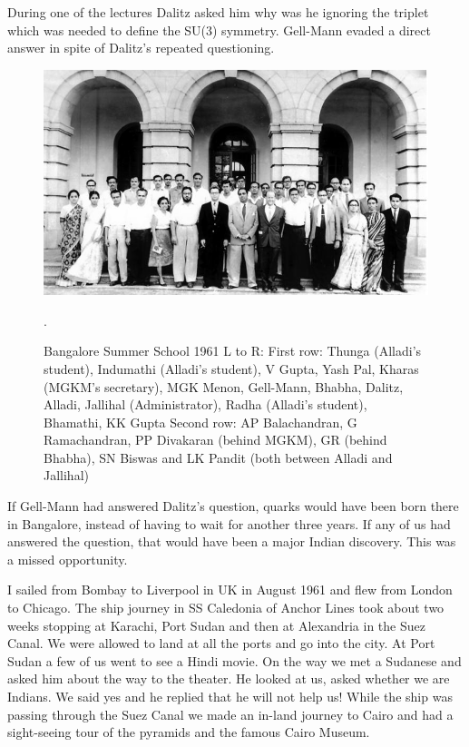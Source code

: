 During one of the lectures Dalitz asked him why was he ignoring the 
triplet which was needed to define the SU(3) symmetry. Gell-Mann evaded 
a direct answer in spite of Dalitz's repeated questioning.
\medskip

\begin{figure}[h]
\centering
\includegraphics[width=\textwidth]{images/Rajaji-gellmann.jpg}
\caption{Bangalore Summer School 1961
L to R: First row: Thunga (Alladi's student), Indumathi (Alladi's
student), V Gupta, Yash Pal, Kharas (MGKM's secretary), MGK Menon, 
Gell-Mann, Bhabha, Dalitz, Alladi, Jallihal (Administrator), 
Radha (Alladi's student), Bhamathi, KK Gupta
Second row: AP Balachandran, G Ramachandran, PP Divakaran (behind
MGKM), GR (behind Bhabha), SN Biswas and LK Pandit (both between
Alladi and Jallihal)}.
\end{figure}
\eject
 
If Gell-Mann had answered Dalitz's question, quarks would have been born 
there in Bangalore, instead of having to wait for another three years. 
If any of us had answered the question, that would have been a major 
Indian discovery. This was a missed opportunity.

I sailed from Bombay to Liverpool in UK in August 1961 and flew from 
London to Chicago. The ship journey in SS Caledonia of Anchor Lines took 
about two weeks stopping at Karachi, Port Sudan and then at Alexandria 
in the Suez Canal. We were allowed to land at all the ports and go into 
the city. At Port Sudan a few of us went to see a Hindi movie. On the 
way we met a Sudanese and asked him about the way to the theater. He 
looked at us, asked whether we are Indians. We said yes and he replied 
that he will not help us! While the ship was passing through the Suez 
Canal we made an in-land journey to Cairo and had a sight-seeing tour of 
the pyramids and the famous Cairo Museum.

